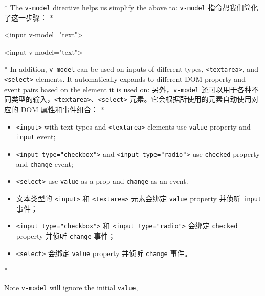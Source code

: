 \begin{paracol}{2}
\switchcolumn[0]*%
The \texttt{v-model} directive helps us simplify the above to:
\switchcolumn
\texttt{v-model} 指令帮我们简化了这一步骤：
\switchcolumn[0]*%
\begin{codeHtml}
    <input v-model="text">
    \end{codeHtml}
\switchcolumn
\begin{codeHtml}
<input v-model="text">
\end{codeHtml}
\switchcolumn[0]*%
In addition, \texttt{v-model} can be used on inputs of different types,
\texttt{\textless{}textarea\textgreater{}}, and
\texttt{\textless{}select\textgreater{}} elements. It automatically
expands to different DOM property and event pairs based on the element
it is used on:
\switchcolumn
另外，\texttt{v-model}
还可以用于各种不同类型的输入，\texttt{\textless{}textarea\textgreater{}}、\texttt{\textless{}select\textgreater{}}
元素。它会根据所使用的元素自动使用对应的 DOM 属性和事件组合：
\switchcolumn[0]*%
\begin{itemize}
    \item
      \texttt{\textless{}input\textgreater{}} with text types and
      \texttt{\textless{}textarea\textgreater{}} elements use \texttt{value}
      property and \texttt{input} event;
    \item
      \texttt{\textless{}input\ type="checkbox"\textgreater{}} and
      \texttt{\textless{}input\ type="radio"\textgreater{}} use
      \texttt{checked} property and \texttt{change} event;
    \item
      \texttt{\textless{}select\textgreater{}} use \texttt{value} as a prop
      and \texttt{change} as an event.
    \end{itemize}
\switchcolumn
\begin{itemize}
\item
  文本类型的 \texttt{\textless{}input\textgreater{}} 和
  \texttt{\textless{}textarea\textgreater{}} 元素会绑定 \texttt{value}
  property 并侦听 \texttt{input} 事件；
\item
  \texttt{\textless{}input\ type="checkbox"\textgreater{}} 和
  \texttt{\textless{}input\ type="radio"\textgreater{}} 会绑定
  \texttt{checked} property 并侦听 \texttt{change} 事件；
\item
  \texttt{\textless{}select\textgreater{}} 会绑定 \texttt{value}
  property 并侦听 \texttt{change} 事件。
\end{itemize}
\switchcolumn[0]*%
\begin{vueQuote}{Note}
    \texttt{v-model} will ignore the initial \texttt{value},

\end{vueQuote}
\end{paracol}
